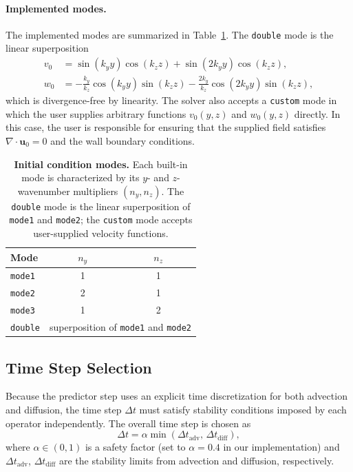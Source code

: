 \paragraph{Implemented modes.}
The implemented modes are summarized in Table~\ref{tab:icmodes}. The \texttt{double} mode is the linear superposition
\begin{align}
    v_0 &= \sin(k_y y)\cos(k_z z) + \sin(2k_y y)\cos(k_z z), \\
    w_0 &= -\frac{k_y}{k_z}\cos(k_y y)\sin(k_z z)
           -\frac{2k_y}{k_z}\cos(2k_y y)\sin(k_z z),
\end{align}
which is divergence-free by linearity. The solver also accepts a
\texttt{custom} mode in which the user supplies arbitrary functions
$v_0(y,z)$ and $w_0(y,z)$ directly. In this case, the user is
responsible for ensuring that the supplied field satisfies
$\nabla\cdot\mathbf{u}_0 = 0$ and the wall boundary conditions.

\begin{table}[h]
\begin{center}
\begin{tabular}{l c c}
    \hline
    \textbf{Mode} & $n_y$ & $n_z$ \\
    \hline\hline
    \texttt{mode1}  & 1 & 1 \\
    \texttt{mode2}  & 2 & 1 \\
    \texttt{mode3}  & 1 & 2 \\
    \texttt{double} & \multicolumn{2}{c}{superposition of \texttt{mode1} and \texttt{mode2}} \\
    \hline
\end{tabular}
\caption{\textbf{Initial condition modes.} Each built-in mode is
characterized by its $y$- and $z$-wavenumber multipliers $(n_y, n_z)$.
The \texttt{double} mode is the linear superposition of \texttt{mode1}
and \texttt{mode2}; the \texttt{custom} mode accepts user-supplied
velocity functions.}
\label{tab:icmodes}
\end{center}
\end{table}

\subsection{Time Step Selection}

Because the predictor step uses an explicit time discretization for both advection and diffusion, the time step $\Delta t$ must satisfy stability conditions imposed by each operator independently. The overall time step is chosen as
\begin{equation}
    \Delta t = \alpha \min\!\left(\Delta t_{\mathrm{adv}},\,
    \Delta t_{\mathrm{diff}}\right),
    \label{eq:dt}
\end{equation}
where $\alpha \in (0,1)$ is a safety factor (set to $\alpha = 0.4$ in our implementation) and $\Delta t_{\mathrm{adv}}$, $\Delta t_{\mathrm{diff}}$ are the stability limits from advection and diffusion, respectively.

